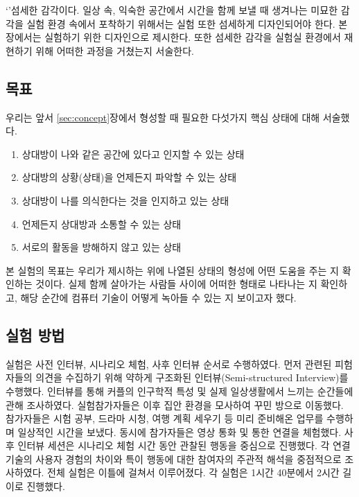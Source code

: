 `\concept'\는 섬세한 감각이다. 일상 속, 익숙한 공간에서 시간을 함께 보낼 때 생겨나는 미묘한 감각을 실험 환경 속에서 포착하기 위해서는 실험 또한 섬세하게 디자인되어야 한다. 본 장에서는 \concept\를 실험하기 위한 디자인으로 \expUser\를 제시한다. 또한 섬세한 감각을 실험실 환경에서 재현하기 위해 어떠한 과정을 거쳤는지 서술한다.

\subsection{목표}
\label{subsec:exp_goal}

우리는 앞서 \ref{sec:concept}장에서 \concept\를 형성할 때 필요한 다섯가지 핵심 상태에 대해 서술했다.

\begin{center}
\begin{minipage}{.6\textwidth}
\begin{enumerate}[label=\Roman*., noitemsep]
	\item 상대방이 나와 같은 공간에 있다고 인지할 수 있는 상태
	\item 상대방의 상황(상태)을 언제든지 파악할 수 있는 상태
	\item 상대방이 나를 의식한다는 것을 인지하고 있는 상태
	\item 언제든지 상대방과 소통할 수 있는 상태
	\item 서로의 활동을 방해하지 않고 있는 상태
\end{enumerate}
\end{minipage}
\end{center}

\noindent 본 실험의 목표는 우리가 제시하는 \sysname\이 위에 나열된 상태의 형성에 어떤 도움을 주는 지 확인하는 것이다. 실제 함께 살아가는 사람들 사이에 \concept\가 어떠한 형태로 나타나는 지 확인하고, 해당 순간에 컴퓨터 기술이 어떻게 녹아들 수 있는 지 보이고자 했다.


\subsection{실험 방법}

실험은 사전 인터뷰, 시나리오 체험, 사후 인터뷰 순서로 수행하였다.
먼저 \concept\와 관련된 피험자들의 의견을 수집하기 위해 약하게 구조화된 인터뷰(Semi-structured Interview)를 수행했다. 인터뷰를 통해 커플의 인구학적 특성 및 실제 일상생활에서 \concept\를 느끼는 순간들에 관해 조사하였다.
실험참가자들은 이후 집안 환경을 모사하여 꾸민 방으로 이동했다. 참가자들은 시험 공부, 드라마 시청, 여행 계획 세우기 등 미리 준비해온 업무를 수행하며 일상적인 시간을 보냈다. 동시에 참가자들은 영상 통화 및 \sysname\을 통한 연결을 체험했다.
사후 인터뷰 세션은 시나리오 체험 시간 동안 관찰된 행동을 중심으로 진행했다. 각 연결 기술의 사용자 경험의 차이와 특이 행동에 대한 참여자의 주관적 해석을 중점적으로 조사하였다.
전체 실험은 이틀에 걸쳐서 이루어졌다. 각 실험은 1시간 40분에서 2시간 길이로 진행했다.

